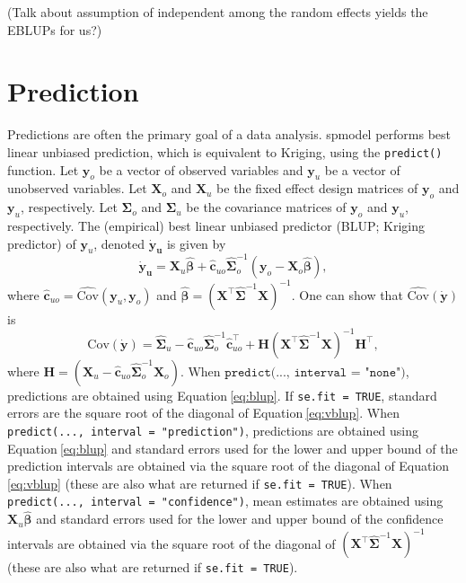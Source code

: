 \documentclass{article}
\begin{document}
(Talk about assumption of independent among the random effects yields
the EBLUPs for us?)

\hypertarget{prediction}{%
\section{Prediction}\label{prediction}}

Predictions are often the primary goal of a data analysis. spmodel
performs best linear unbiased prediction, which is equivalent to
Kriging, using the \texttt{predict()} function. Let \(\mathbf{y}_o\) be
a vector of observed variables and \(\mathbf{y}_u\) be a vector of
unobserved variables. Let \(\mathbf{X}_o\) and \(\mathbf{X}_u\) be the
fixed effect design matrices of \(\mathbf{y}_o\) and \(\mathbf{y}_u\),
respectively. Let \(\mathbf{\Sigma}_o\) and \(\mathbf{\Sigma}_u\) be the
covariance matrices of \(\mathbf{y}_o\) and \(\mathbf{y}_u\),
respectively. The (empirical) best linear unbiased predictor (BLUP;
Kriging predictor) of \(\mathbf{y}_u\), denoted \(\mathbf{\dot{y}_u}\)
is given by \begin{equation}\label{eq:blup}
  \mathbf{\dot{y}_u} =  \mathbf{X}_u \bm{\hat{\beta}} + \mathbf{\hat{c}}_{uo} \mathbf{\hat{\Sigma}}^{-1}_o (\mathbf{y}_o - \mathbf{X}_o \bm{\hat{\beta}}) ,
\end{equation} where
\(\mathbf{\hat{c}}_{uo} = \hat{\text{Cov}}(\mathbf{y}_u, \mathbf{y}_o)\)
and
\(\bm{\hat{\beta}} = (\mathbf{X}^\intercal \mathbf{\hat{\Sigma}}^{-1} \mathbf{X})^{-1}\).
One can show that \(\hat{\text{Cov}}(\mathbf{\dot{y}})\) is
\begin{equation}\label{eq:vblup}
  \text{Cov}(\mathbf{\dot{y}}) = \mathbf{\hat{\Sigma}}_u - \mathbf{\hat{c}}_{uo} \mathbf{\hat{\Sigma}}^{-1}_o \mathbf{\hat{c}}_{uo}^\intercal + \mathbf{H}(\mathbf{X}^\intercal \mathbf{\hat{\Sigma}}^{-1} \mathbf{X})^{-1}\mathbf{H}^\intercal ,
\end{equation} where
\(\mathbf{H} = (\mathbf{X}_u - \mathbf{\hat{c}}_{uo} \mathbf{\hat{\Sigma}}^{-1}_o \mathbf{X}_o)\).
When \(\texttt{predict(..., interval = "none")}\), predictions are
obtained using Equation\(~\)\ref{eq:blup}. If \texttt{se.fit = TRUE},
standard errors are the square root of the diagonal of
Equation\(~\)\ref{eq:vblup}. When
\texttt{predict(..., interval = "prediction")}, predictions are obtained
using Equation\(~\)\ref{eq:blup} and standard errors used for the lower
and upper bound of the prediction intervals are obtained via the square
root of the diagonal of Equation\(~\)\ref{eq:vblup} (these are also what
are returned if \texttt{se.fit = TRUE}). When
\texttt{predict(..., interval = "confidence")}, mean estimates are
obtained using \(\mathbf{X}_u \bm{\hat{\beta}}\) and standard errors
used for the lower and upper bound of the confidence intervals are
obtained via the square root of the diagonal of
\((\mathbf{X}^\intercal \mathbf{\hat{\Sigma}}^{-1} \mathbf{X})^{-1}\)
(these are also what are returned if \texttt{se.fit = TRUE}).
\end{document}
